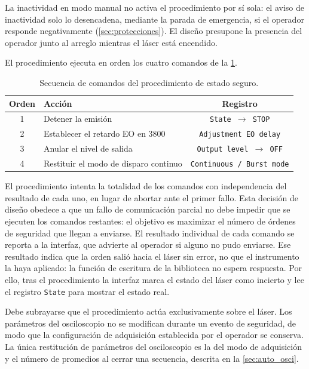 La inactividad en modo manual no activa el procedimiento por sí sola:
el aviso de inactividad solo lo desencadena, mediante la parada de
emergencia, si el operador responde negativamente
(\cref{sec:protecciones}). El diseño presupone la presencia del
operador junto al arreglo mientras el láser está encendido.

El procedimiento ejecuta en orden los cuatro comandos de la
\cref{tab:modo_seguro}.

\begin{table}[H]
  \centering
  \caption{Secuencia de comandos del procedimiento de estado seguro.}
  \label{tab:modo_seguro}
  \begin{tabular}{clc}
    \toprule
    \textbf{Orden} & \textbf{Acción} & \textbf{Registro} \\
    \midrule
    1 & Detener la emisión & \texttt{State $\rightarrow$ STOP} \\
    2 & Establecer el retardo EO en 3800 & \texttt{Adjustment EO delay} \\
    3 & Anular el nivel de salida & \texttt{Output level $\rightarrow$ OFF} \\
    4 & Restituir el modo de disparo continuo
      & \texttt{Continuous / Burst mode} \\
    \bottomrule
  \end{tabular}
\end{table}

El procedimiento intenta la totalidad de los comandos con
independencia del resultado de cada uno, en lugar de abortar ante el
primer fallo. Esta decisión de diseño obedece a que un fallo de
comunicación parcial no debe impedir que se ejecuten los comandos
restantes: el objetivo es maximizar el número de órdenes de
seguridad que llegan a enviarse. El resultado individual de cada
comando se reporta a la interfaz, que advierte al operador si alguno
no pudo enviarse. Ese resultado indica que la orden salió hacia el
láser sin error, no que el instrumento la haya aplicado: la función de
escritura de la biblioteca no espera respuesta. Por ello, tras el
procedimiento la interfaz marca el estado del láser como incierto y
lee el registro \texttt{State} para mostrar el estado real.

Debe subrayarse que el procedimiento actúa exclusivamente sobre el
láser. Los parámetros del osciloscopio no se modifican durante un
evento de seguridad, de modo que la configuración de adquisición
establecida por el operador se conserva. La única restitución de
parámetros del osciloscopio es la del modo de adquisición y el número
de promedios al cerrar una secuencia, descrita en la
\cref{sec:auto_osci}.

